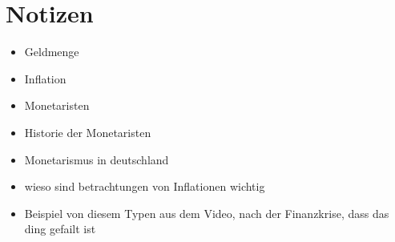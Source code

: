\documentclass[
	12pt,
	BCOR=5mm,
	DIV=12,
	headinclude=on,
	footinclude=off,
	parskip=half,
	bibliography=totoc,
	listof=entryprefix,
	toc=listof,
	numbers=noenddot,
]{scrreprt}
\begin{document}
\section*{Notizen}

\begin{itemize}
    \item Geldmenge
    \item Inflation
    \item Monetaristen
    \item Historie der Monetaristen
    \item Monetarismus in deutschland
    \item wieso sind betrachtungen von Inflationen wichtig
    \item Beispiel von diesem Typen aus dem Video, nach der Finanzkrise, dass das ding gefailt ist
\end{itemize}

\printbibliography[title=Literaturverzeichnis]
\end{document}
